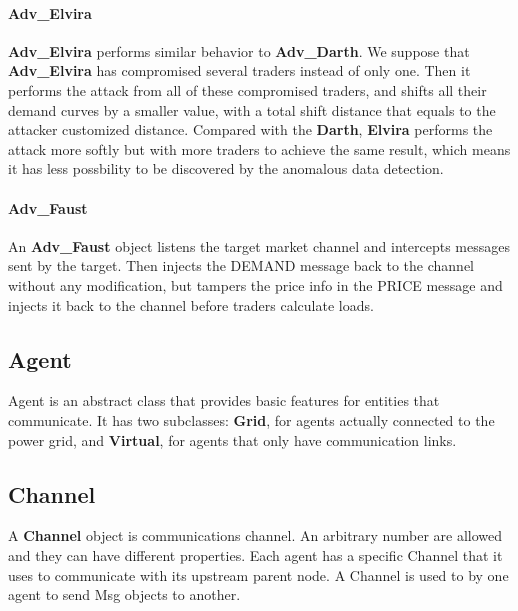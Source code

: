 \documentclass[12pt]{article}
\begin{document}
\paragraph{Adv\_Elvira} \mbox{}

\textbf{Adv\_Elvira} performs similar behavior to \textbf{Adv\_Darth}. We suppose that \textbf{Adv\_Elvira}
has compromised several traders instead of only one. Then it performs the attack from 
all of these compromised traders, and shifts all their demand curves by a smaller value, 
with a total shift distance that equals to the attacker customized distance. Compared 
with the \textbf{Darth}, \textbf{Elvira} performs the attack more softly but with more traders to achieve 
the same result, which means it has less possbility to be discovered by the anomalous data 
detection.

\paragraph{Adv\_Faust} \mbox{}

An \textbf{Adv\_Faust} object listens the target market channel and intercepts messages 
sent by the target. Then injects the DEMAND message back to the channel without any
modification, but tampers the price info in the PRICE message and injects it back 
to the channel before traders calculate loads. 

\subsection{Agent} \mbox{}
\label{subsec:objects_agent}

Agent is an abstract class that provides basic features for entities that 
communicate.  It has two subclasses: \textbf{Grid}, for agents actually connected
to the power grid, and \textbf{Virtual}, for agents that only have communication 
links.

\subsection{Channel} \mbox{}
\label{subsec:objects_channel}

A \textbf{Channel} object is communications channel.  An arbitrary number are 
allowed and they can have different properties.  Each agent has a specific 
Channel that it uses to communicate with its upstream parent node.  A Channel 
is used to by one agent to send Msg objects to another.
\end{document}
